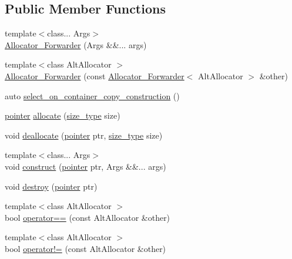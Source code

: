 \subsection*{Public Member Functions}
\begin{DoxyCompactItemize}
\item 
{\footnotesize template$<$class... Args$>$ }\\\hyperlink{structbc_1_1allocators_1_1Allocator__Forwarder_a2fb4070e5a39213c55350e8f60f02b70}{Allocator\+\_\+\+Forwarder} (Args \&\&... args)
\item 
{\footnotesize template$<$class Alt\+Allocator $>$ }\\\hyperlink{structbc_1_1allocators_1_1Allocator__Forwarder_afaf9973cd1c540a087d2867e1761b5f9}{Allocator\+\_\+\+Forwarder} (const \hyperlink{structbc_1_1allocators_1_1Allocator__Forwarder}{Allocator\+\_\+\+Forwarder}$<$ Alt\+Allocator $>$ \&other)
\item 
auto \hyperlink{structbc_1_1allocators_1_1Allocator__Forwarder_ae3b8cb6895bbbfa4a733a5ab786ae603}{select\+\_\+on\+\_\+container\+\_\+copy\+\_\+construction} ()
\item 
\hyperlink{structbc_1_1allocators_1_1Allocator__Forwarder_ae9d48fbeb22a6686ad59128cf309d8bd}{pointer} \hyperlink{structbc_1_1allocators_1_1Allocator__Forwarder_ae4cfe7f365197fa85632a9bb2c585af8}{allocate} (\hyperlink{structbc_1_1allocators_1_1Allocator__Forwarder_a254a9a5b0ac8837f64c107db7067e985}{size\+\_\+type} size)
\item 
void \hyperlink{structbc_1_1allocators_1_1Allocator__Forwarder_aefc326251206590325061d8db5b580e7}{deallocate} (\hyperlink{structbc_1_1allocators_1_1Allocator__Forwarder_ae9d48fbeb22a6686ad59128cf309d8bd}{pointer} ptr, \hyperlink{structbc_1_1allocators_1_1Allocator__Forwarder_a254a9a5b0ac8837f64c107db7067e985}{size\+\_\+type} size)
\item 
{\footnotesize template$<$class... Args$>$ }\\void \hyperlink{structbc_1_1allocators_1_1Allocator__Forwarder_ae1f168c0dd9d8ad36dd346acbd3828ee}{construct} (\hyperlink{structbc_1_1allocators_1_1Allocator__Forwarder_ae9d48fbeb22a6686ad59128cf309d8bd}{pointer} ptr, Args \&\&... args)
\item 
void \hyperlink{structbc_1_1allocators_1_1Allocator__Forwarder_ac1850fadacf28cda7171fde065fbf9ca}{destroy} (\hyperlink{structbc_1_1allocators_1_1Allocator__Forwarder_ae9d48fbeb22a6686ad59128cf309d8bd}{pointer} ptr)
\item 
{\footnotesize template$<$class Alt\+Allocator $>$ }\\bool \hyperlink{structbc_1_1allocators_1_1Allocator__Forwarder_a2babb5f67db242f472698faa7b35d904}{operator==} (const Alt\+Allocator \&other)
\item 
{\footnotesize template$<$class Alt\+Allocator $>$ }\\bool \hyperlink{structbc_1_1allocators_1_1Allocator__Forwarder_a40b22dcdc0fdb388389bac905bf2aec7}{operator!=} (const Alt\+Allocator \&other)
\end{DoxyCompactItemize}


